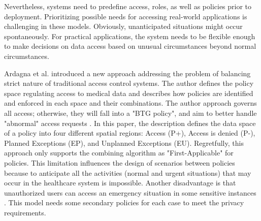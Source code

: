 \documentclass[conference]{IEEEtran}
\begin{document}
Nevertheless, systems need to predefine access, roles, as well as policies prior to deployment. 
Prioritizing possible needs for accessing real-world applications is challenging in these models.
Obviously, unanticipated situations might occur spontaneously.
For practical applications, the system needs to be flexible enough to make decisions on data access based on unusual circumstances beyond normal circumstances.

Ardagna et al. \cite{ardagna2008regulating} introduced a new approach addressing the problem of balancing strict nature of traditional access control systems. 
The author defines the policy space regulating access to medical data and describes how policies are identified and enforced in each space and their combinations. 
The author approach governs all access; otherwise, they will fall into a "BTG policy", and aim to better handle "abnormal" access requests \cite{ardagna2010access}. 
In this paper, the description defines the data space of a policy into four different spatial regions: Access (P+), Access is denied (P-), Planned Exceptions (EP), and Unplanned Exceptions (EU). 
Regretfully, this approach only supports the combining algorithm as "First-Applicable" for policies. 
This limitation influences the design of scenarios between policies because to anticipate all the activities (normal and urgent situations) that may occur in the healthcare system is impossible. 
Another disadvantage is that unauthorized users can access an emergency situation in some sensitive instances \cite{balasubramaniam2013white}. 
This model needs some secondary policies for each case to meet the privacy requirements.
\end{document}
